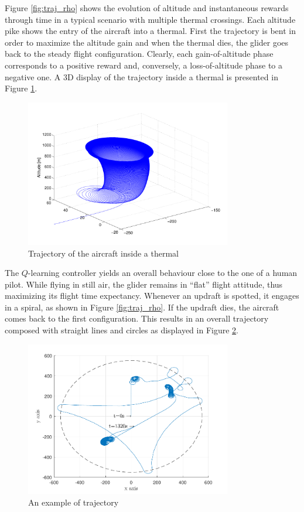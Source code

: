 \documentclass[a4paper, 10pt, conference]{ieeeconf}
\begin{document}
Figure \ref{fig:traj_rho} shows the evolution of altitude and instantaneous rewards through time in a typical scenario with multiple thermal crossings. Each altitude pike shows the entry of the aircraft into a thermal. First the trajectory is bent in order to maximize the altitude gain and when the thermal dies, the glider goes back to the steady flight configuration. Clearly, each gain-of-altitude phase corresponds to a positive reward and, conversely, a loss-of-altitude phase to a negative one. A 3D display of the trajectory inside a thermal is presented in Figure \ref{fig:traj_high_alt}.

\begin{figure}
\begin{center}
 \includegraphics[width=9cm]{img/traj_high_alt.pdf}
\end{center}
 \caption{Trajectory of the aircraft inside a thermal}
 \label{fig:traj_high_alt}
\end{figure}

The $Q$-learning controller yields an overall behaviour close to the one of a human pilot. While flying in still air, the glider remains in ``flat'' flight attitude, thus maximizing its flight time expectancy. Whenever an updraft is spotted, it engages in a spiral, as shown in Figure \ref{fig:traj_rho}. If the updraft dies, the aircraft comes back to the first configuration. This results in an overall trajectory composed with straight lines and circles as displayed in Figure \ref{fig:full_traj}.

\begin{figure}
\begin{center}
 \includegraphics[width=9cm]{img/full_traj.pdf}
\end{center}
\caption{An example of trajectory}
\label{fig:full_traj}
\end{figure}
\end{document}
